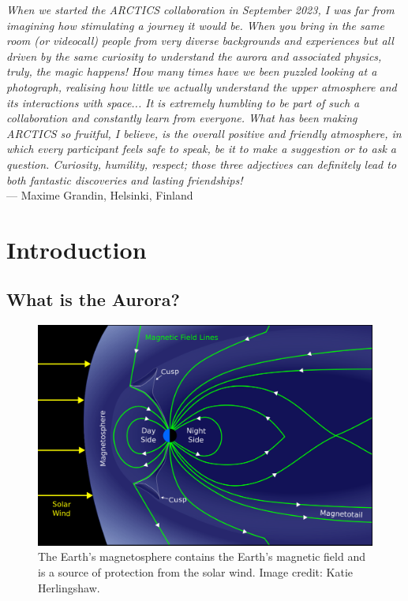 \documentclass{article}
\newcommand{\contributed}[1]{%
    \par\noindent
    \begingroup
    \setlength{\leftskip}{1em}%
    \itshape
    Contributors: #1
    \par
    \endgroup
    \vspace{0.5em}
}
\begin{document}
\textit{When we started the ARCTICS collaboration in September 2023, I was far from imagining how stimulating a journey it would be. When you bring in the same room (or videocall) people from very diverse backgrounds and experiences but all driven by the same curiosity to understand the aurora and associated physics, truly, the magic happens! How many times have we been puzzled looking at a photograph, realising how little we actually understand the upper atmosphere and its interactions with space... It is extremely humbling to be part of such a collaboration and constantly learn from everyone. What has been making ARCTICS so fruitful, I believe, is the overall positive and friendly atmosphere, in which every participant feels safe to speak, be it to make a suggestion or to ask a question. Curiosity, humility, respect; those three adjectives can definitely lead to both fantastic discoveries and lasting friendships!}\\
--- Maxime Grandin, Helsinki, Finland\\


\section{Introduction}

\subsection{What is the Aurora?}\label{what-is-aurora}
\begin{figure}
\includegraphics[width=\linewidth]{Fig1_magnetosphere.png}
\caption{The Earth's magnetosphere contains the Earth's magnetic field and is a source of protection from the solar wind. Image credit: Katie Herlingshaw.}
\label{fig-magnetosphere}
\end{figure} 
\end{document}
